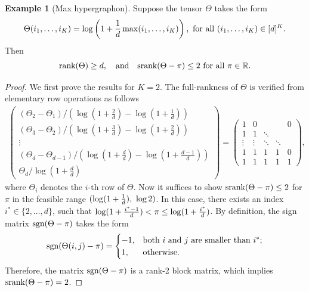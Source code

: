 \documentclass[11pt]{article}
\theoremstyle{plain}
\theoremstyle{definition}
\newtheorem{example}{Example}
\def\sign{\textup{sgn}}
\def\srank{\textup{srank}}
\def\rank{\textup{rank}}
\begin{document}
\begin{example}[Max hypergraphon]\label{example:max} Suppose the tensor $\Theta$ takes the form 
\[
\Theta(i_1,\ldots,i_K)=\log\left(1+{1\over d}\max(i_1,\ldots,i_K)\right), \ \text{for all }(i_1,\ldots,i_K)\in[d]^K.
\]
 Then 
 \[
 \rank(\Theta)\geq d, \quad \text{and}\quad \srank(\Theta-\pi)\leq 2\ \text{for all }\pi\in\mathbb{R}. 
 \]
\end{example}
\begin{proof}
We first prove the results for $K=2$. The full-rankness of $\Theta$ is verified from elementary row operations as follows
\begin{align}
\begin{pmatrix}
(\Theta_2-\Theta_1)/(\log(1+\frac{2}{d})-\log(1+\frac{1}{d}))\\(\Theta_3-\Theta_2)/(\log(1+\frac{3}{d})-\log(1+\frac{2}{d}))\\\vdots\\ (\Theta_d-\Theta_{d-1})/(\log(1+\frac{d}{d})-\log(1+\frac{d-1}{d}))\\\Theta_d/\log(1+\frac{d}{d})
\end{pmatrix} = \begin{pmatrix}
 1&          0  &        &              &          0 \\
1& 1 & \ddots &              &            \\
      \vdots &     \vdots & \ddots &       \ddots &            \\
 1 & 1 &1 & 1 &0\\
 1 & 1 &1 & 1 &1
\end{pmatrix},
\end{align}
where $\Theta_i$ denotes the $i$-th row of $\Theta$. 
Now it suffices to show $\srank(\Theta-\pi)\leq 2$ for $\pi$ in the feasible range $(\log(1+{1\over d}),\ \log 2)$. In this case, there exists an index $i^*\in\{2,\ldots,d\}$, such that $\log(1+{i^*-1\over d})< \pi\leq \log(1+{i^*\over d})$. By definition, the sign matrix $\sign (\Theta-\pi)$ takes the form
\begin{equation}\label{eq:matrix}
\sign (\Theta(i,j)-\pi)=
\begin{cases}
-1, & \text{both $i$ and $j$ are smaller than $i^*$};\\
1, & \text{otherwise}.
\end{cases}
\end{equation}
Therefore, the matrix $\sign (\Theta-\pi)$ is a rank-2 block matrix, which implies $\srank(\Theta-\pi)=2$. 


\end{proof}
\end{document}
